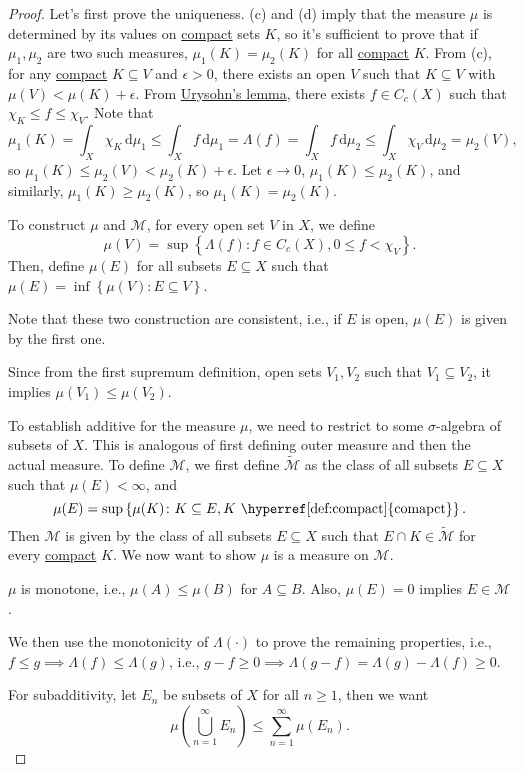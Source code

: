 \begin{proof}\let\qed\relax
	Let's first prove the uniqueness. (c) and (d) imply that the measure \(\mu \) is determined by its values on \hyperref[def:compact]{compact} sets \(K\), so it's sufficient to prove that if \(\mu _1, \mu _2\) are two such measures, \(\mu _1(K) = \mu _2(K)\) for all \hyperref[def:compact]{compact} \(K\). From (c), for any \hyperref[def:compact]{compact} \(K \subseteq V\) and \(\epsilon > 0\), there exists an open \(V\) such that \(K \subseteq V\) with \(\mu (V) < \mu (K) + \epsilon \). From \hyperref[thm:Urysohn-lemma]{Urysohn's lemma}, there exists \(f\in C_c(X)\) such that \(\chi _K \leq f \leq \chi _V\). Note that
	\[
		\mu _1(K)
		= \int_{X} \chi _K \,\mathrm{d}\mu _1
		\leq \int _X f\,\mathrm{d} \mu _1
		= \Lambda (f)
		= \int _X f\,\mathrm{d} \mu _2
		\leq \int _X \chi _V \,\mathrm{d} \mu _2
		= \mu _2(V),
	\]
	so \(\mu _1(K) \leq \mu _2(V) < \mu _2(K) + \epsilon \). Let \(\epsilon \to 0\), \(\mu _1(K) \leq \mu _2(K)\), and similarly, \(\mu _1(K) \geq \mu _2(K)\), so \(\mu _1(K) = \mu _2(K)\).

	To construct \(\mu \) and \(\mathcal{M} \), for every open set \(V\) in \(X\), we define
	\[
		\mu (V) = \sup \left\{ \Lambda (f) \colon f\in C_c(X), 0 \leq f < \chi _V \right\}.
	\]
	Then, define \(\mu (E)\) for all subsets \(E \subseteq X\) such that \(\mu (E) = \inf \left\{ \mu (V)\colon E \subseteq V \right\} \).

	\begin{note}
		Note that these two construction are consistent, i.e., if \(E\) is open, \(\mu (E)\) is given by the first one.
	\end{note}
	\begin{explanation}
		Since from the first supremum definition, open sets \(V_1, V_2\) such that \(V_1 \subseteq V_2\), it implies \(\mu (V_1) \leq \mu (V_2)\).
	\end{explanation}

	To establish additive for the measure \(\mu \), we need to restrict to some \(\sigma \)-algebra of subsets of \(X\). This is analogous of first defining outer measure and then the actual measure. To define \(\mathcal{M} \), we first define \(\widetilde{\mathcal{M}}\) as the class of all subsets \(E \subseteq X\) such that \(\mu (E) < \infty \), and
	\[
		\mu (E) = \sup \left\{ \mu (K) \colon K \subseteq E, K \text{ \hyperref[def:compact]{comapct}}  \right\}.
	\]
	Then \(\mathcal{M} \) is given by the class of all subsets \(E \subseteq X\) such that \(E \cap K \in \widetilde{\mathcal{M} }\) for every \hyperref[def:compact]{compact} \(K\). We now want to show \(\mu \) is a measure on \(\mathcal{M} \).
	\begin{note}
		\(\mu \) is monotone, i.e., \(\mu (A) \leq \mu (B)\) for \(A \subseteq B\). Also, \(\mu (E) = 0\) implies \(E\in \mathcal{M} \).
	\end{note}
	We then use the monotonicity of \(\Lambda (\cdot)\) to prove the remaining properties, i.e., \(f\leq g \implies \Lambda (f) \leq \Lambda (g)\), i.e., \(g-f \geq 0 \implies \Lambda (g - f) = \Lambda (g) - \Lambda (f) \geq 0\).

	For subadditivity, let \(E_n\) be subsets of \(X\) for all \(n \geq 1\), then we want
	\[
		\mu \left( \bigcup_{n=1}^{\infty} E_n \right) \leq \sum_{n=1}^{\infty} \mu (E_n).
	\]
\end{proof}